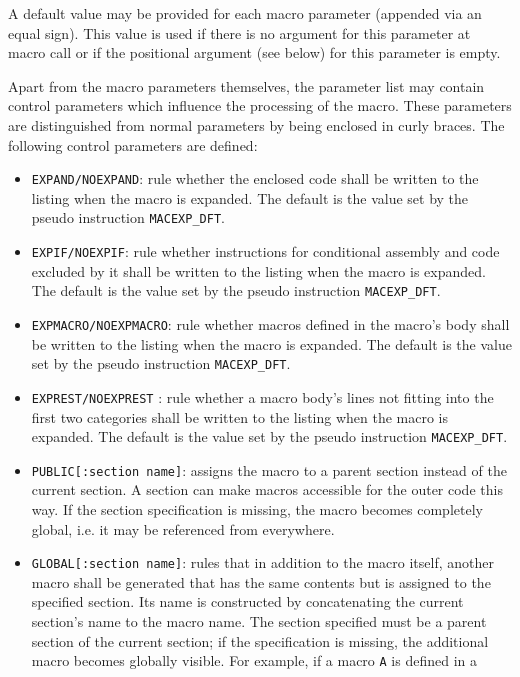 \documentclass[12pt,twoside]{report}
\newcommand{\tty}[1]{{\tt #1}}
\begin{document}
A default value may be provided for each macro parameter
(appended via an equal sign).  This value is used if there is no
argument for this parameter at macro call or if the positional
argument (see below) for this parameter is empty.

Apart from the macro parameters themselves, the parameter list may
contain control parameters which influence the processing of the
macro.  These parameters are distinguished from normal parameters by
being enclosed in curly braces.  The following control parameters are
defined:
\begin{itemize}
\item{\tty{EXPAND/NOEXPAND}: rule whether the enclosed code shall
      be written to the listing when the macro is expanded.  The
      default is the value set by the pseudo instruction
      \tty{MACEXP\_DFT}.}
\item{\tty{EXPIF/NOEXPIF}: rule whether instructions for
      conditional assembly and code excluded by it shall
      be written to the listing when the macro is expanded.  The
      default is the value set by the pseudo instruction
      \tty{MACEXP\_DFT}.}
\item{\tty{EXPMACRO/NOEXPMACRO}: rule whether macros defined in
      the macro's body shall be written to the listing when the macro
      is expanded.  The default is the value set by the pseudo instruction
      \tty{MACEXP\_DFT}.}
\item{\tty{EXPREST/NOEXPREST} : rule whether a macro body's lines
      not fitting into the first two categories shall be written to the
      listing when the macro is expanded. The default is the value set by
      the pseudo instruction \tty{MACEXP\_DFT}.}
\item{\tty{PUBLIC[:section name]}: assigns the macro to a parent section
      instead of the current section.  A section can make macros
      accessible for the outer code this way.  If the section
      specification is missing, the macro becomes completely global, i.e.
      it may be referenced from everywhere.}
\item{\tty{GLOBAL[:section name]}: rules that in addition to the macro
      itself, another macro shall be generated that has the same contents
      but is assigned to the specified section.  Its name is constructed by
      concatenating the current section's name to the macro name.  The
      section specified must be a parent section of the current section;
      if the specification is missing, the additional macro becomes
      globally visible.  For example, if a macro \tty{A} is defined in a
}
\end{itemize}
\end{document}
